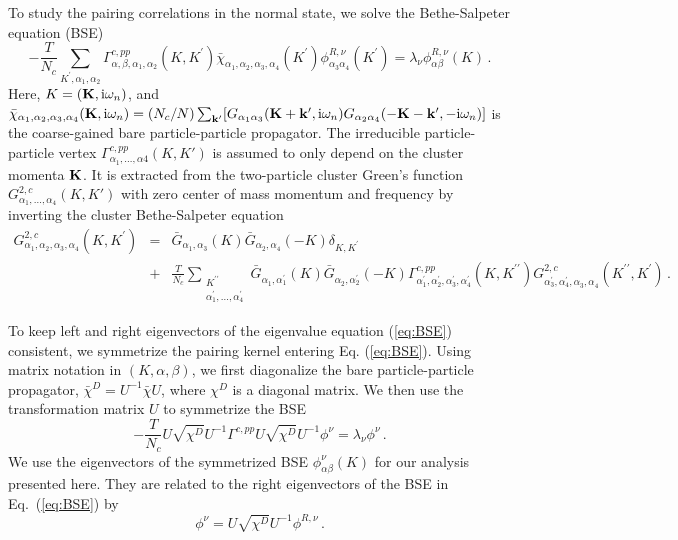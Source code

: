 \documentclass[reprint,nofootinbib,nobibnotes,amsmath,amssymb,aps,prb,floatfix]{revtex4-1}
\begin{document}
\begin{widetext}
To study the pairing correlations in the normal state, we solve the Bethe-Salpeter equation (BSE)
\begin{equation} \label{eq:BSE}
    -\frac{T}{N_c} \sum_{K^\prime,\alpha_1,\alpha_2} \Gamma^{c, pp}_{\alpha,\beta,\alpha_1,\alpha_2}(K,K^\prime)\bar{\chi}_{\alpha_1,\alpha_2,\alpha_3,\alpha_4}(K^\prime) \phi^{R,\nu}_{\alpha_3\alpha_4}(K^\prime) = \lambda_\nu \phi^{R,\nu}_{\alpha\beta}(K)\,.
\end{equation}
Here, $K=({\bf K},\text{i}\omega_n)$, and $\bar{\chi}_{\alpha_1,\alpha_2,\alpha_3,\alpha_4}({\bf K}, \text{i}\omega_n) = (N_c/N) \sum_{{\bf k}^\prime} [G_{\alpha_1\alpha_3}({\bf K+k'},\text{i}\omega_n)G_{\alpha_2\alpha_4}(-{\bf K}-{\bf k}^\prime, -\text{i}\omega_n)]$ is the coarse-gained bare particle-particle propagator. The irreducible particle-particle vertex $\Gamma^{c, pp}_{\alpha_1,\dots,\alpha4}(K,K')$ is assumed to only depend on the cluster momenta ${\bf K}$. It is extracted from the two-particle cluster Green's function $G^{2,c}_{\alpha_1,\dots,\alpha_4}(K,K')$ with zero center of mass momentum and frequency by inverting the cluster Bethe-Salpeter equation
\begin{eqnarray}\nonumber
G^{2,c}_{\alpha_1,\alpha_2,\alpha_3,\alpha_4}(K,K^\prime) &=&\bar{G}_{\alpha_1,\alpha_3}(K)\bar{G}_{\alpha_2,\alpha_4}(-K)\delta_{K,K^\prime} \\
&+&\frac{T}{N_c}\sum_{\substack{K^{\prime\prime}\\\alpha^\prime_1,\dots,\alpha^\prime_4}}\bar{G}_{\alpha^{\phantom\prime}_1,\alpha^\prime_1}(K)\bar{G}_{\alpha^{\phantom\prime}_2,\alpha^\prime_2}(-K)
\Gamma^{c,pp}_{\alpha^\prime_1,\alpha^\prime_2,\alpha^\prime_3,\alpha^\prime_4}(K,K^{\prime\prime})G^{2,c}_{\alpha^\prime_3,\alpha^\prime_4,\alpha^{\phantom\prime}_3,\alpha^{\phantom\prime}_4}(K^{\prime\prime},K^\prime)\,.
\label{BSE1}
\end{eqnarray}
\end{widetext}

To keep left and right eigenvectors of the eigenvalue equation (\ref{eq:BSE}) consistent, we symmetrize the pairing kernel entering Eq. (\ref{eq:BSE}). Using matrix notation in $(K, \alpha, \beta)$, we first diagonalize the bare particle-particle propagator, $\bar{\chi}^D = U^{-1}\bar{\chi}U$, where $\chi^D$ is a diagonal matrix. We then use the 
transformation matrix $U$ to symmetrize the BSE
\begin{equation}\label{sBSE}
-\frac{T}{N_c} U \sqrt{\chi^D}U^{-1} \Gamma^{c,pp} U \sqrt{\chi^D}U^{-1} \phi^\nu = \lambda_\nu \phi^\nu\,.
\end{equation}
We use the eigenvectors of the symmetrized BSE  $\phi^\nu_{\alpha\beta}(K)$ for our analysis presented here. 
They are related to the right eigenvectors of the BSE in 
Eq.~(\ref{eq:BSE}) by 
\begin{equation}\nonumber
    \phi^\nu = U\sqrt{\chi^D}U^{-1}\phi^{R,\nu}\,.
\end{equation}
\end{document}
